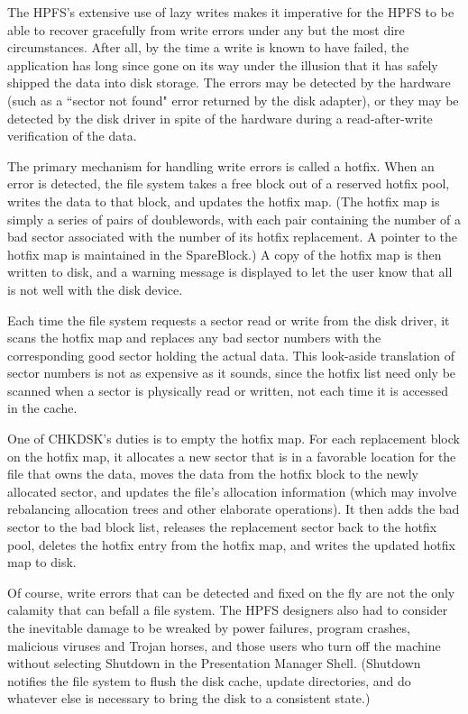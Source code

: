 The HPFS's extensive use of lazy writes makes it imperative for the HPFS to
be able to recover gracefully from write errors under any but the most dire
circumstances.  After all, by the time a write is known to have failed, the
application has long since gone on its way under the illusion that it has
safely shipped the data into disk storage.  The errors may be detected by the
hardware (such as a ``sector not found" error returned by the disk adapter),
or they may be detected by the disk driver in spite of the hardware during a
read-after-write verification of the data.
 
The primary mechanism for handling write errors is called a hotfix.  When an
error is detected, the file system takes a free block out of a reserved
hotfix pool, writes the data to that block, and updates the hotfix map.  (The
hotfix map is simply a series of pairs of doublewords, with each pair
containing the number of a bad sector associated with the number of its
hotfix replacement.  A pointer to the hotfix map is maintained in the
SpareBlock.) A copy of the hotfix map is then written to disk, and a warning
message is displayed to let the user know that all is not well with the disk
device.
 
Each time the file system requests a sector read or write from the disk
driver, it scans the hotfix map and replaces any bad sector numbers with the
corresponding good sector holding the actual data. This look-aside translation
of sector numbers is not as expensive as it sounds, since the hotfix list
need only be scanned when a sector is physically read or written, not each
time it is accessed in the cache.
 
One of CHKDSK's duties is to empty the hotfix map.  For each replacement
block on the hotfix map, it allocates a new sector that is in a favorable
location for the file that owns the data, moves the data from the hotfix
block to the newly allocated sector, and updates the file's allocation
information (which may involve rebalancing allocation trees and other
elaborate operations).  It then adds the bad sector to the bad block list,
releases the replacement sector back to the hotfix pool, deletes the hotfix
entry from the hotfix map, and writes the updated hotfix map to disk.
 
Of course, write errors that can be detected and fixed on the fly are not the
only calamity that can befall a file system.  The HPFS designers also had to
consider the inevitable damage to be wreaked by power failures, program
crashes, malicious viruses and Trojan horses, and those users who turn off the
machine without selecting Shutdown in the Presentation Manager Shell.
(Shutdown notifies the file system to flush the disk cache, update
directories, and do whatever else is necessary to bring the disk to a
consistent state.)
 
